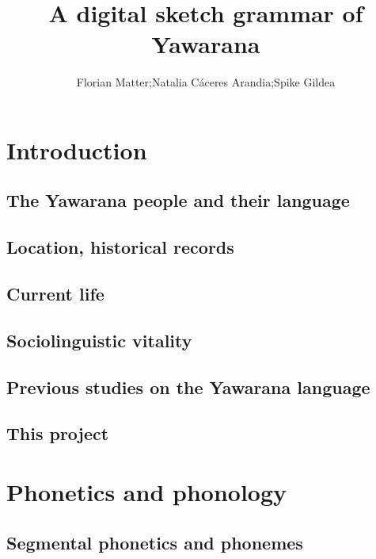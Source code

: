 \documentclass{memoir}
\title{A digital sketch grammar of Yawarana}
\author{Florian Matter;Natalia Cáceres Arandia;Spike Gildea}
\begin{document}


\tableofcontents

\chapter{\texorpdfstring{Introduction \label{intro}}{Introduction }}

\section{\texorpdfstring{The Yawarana people and their language
\label{sec:people}}{The Yawarana people and their language }}

\section{\texorpdfstring{Location, historical records
\label{sec:context}}{Location, historical records }}

\section{\texorpdfstring{Current life
\label{sec:currentlife}}{Current life }}

\section{\texorpdfstring{Sociolinguistic vitality
\label{sec:vitality}}{Sociolinguistic vitality }}

\section{\texorpdfstring{Previous studies on the Yawarana language
\label{sec:previous}}{Previous studies on the Yawarana language }}

\section{\texorpdfstring{This project
\label{sec:thisproject}}{This project }}

\chapter{\texorpdfstring{Phonetics and phonology
\label{phono}}{Phonetics and phonology }}

\section{\texorpdfstring{Segmental phonetics and phonemes
\label{sec:segmental}}{Segmental phonetics and phonemes }}
\end{document}
